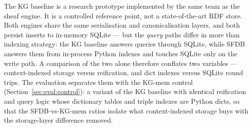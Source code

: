 The KG baseline is a research prototype implemented by the same team as
the sheaf engine. It is a controlled reference point, not a
state-of-the-art RDF store. Both engines share the same serialisation
and canonicalisation layers, and both persist inserts to in-memory
SQLite --- but the \emph{query} paths differ in more than indexing
strategy: the KG baseline answers queries through SQLite, while SFDB
answers them from in-process Python indexes and touches SQLite only on
the write path. A comparison of the two alone therefore conflates two
variables --- context-indexed storage versus reification, and dict
indexes versus SQLite round trips. The evaluation separates them with
the KG-mem control (Section~\ref{sec:eval:control}): a variant of the
KG baseline with identical reification and query logic whose dictionary
tables and triple indexes are Python dicts, so that the SFDB-vs-KG-mem
ratios isolate what context-indexed storage buys with the storage-layer
difference removed.


